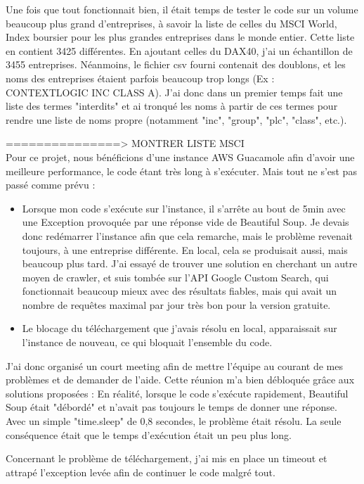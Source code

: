 Une fois que tout fonctionnait bien, il était temps de tester le code sur un volume beaucoup plus grand d'entreprises, à savoir la liste de celles du MSCI World, Index boursier pour les plus grandes entreprises dans le monde entier.
Cette liste en contient 3425 différentes. En ajoutant celles du DAX40, j'ai un échantillon de 3455 entreprises. 
Néanmoins, le fichier csv fourni contenait des doublons, et les noms des entreprises étaient parfois beaucoup trop longs (Ex : CONTEXTLOGIC INC CLASS A).
J'ai donc dans un premier temps fait une liste des termes "interdits" et ai tronqué les noms à partir de ces termes pour rendre une liste de noms propre (notamment "inc", "group", "plc", "class", etc.).

===============> MONTRER LISTE MSCI
\\

Pour ce projet, nous bénéficions d'une instance AWS Guacamole afin d'avoir une meilleure performance, le code étant très long à s'exécuter.
Mais tout ne s'est pas passé comme prévu : 
\begin{itemize}
    \item Lorsque mon code s'exécute sur l'instance, il s'arrête au bout de 5min avec une Exception provoquée par une réponse vide de Beautiful Soup.
    Je devais donc redémarrer l'instance afin que cela remarche, mais le problème revenait toujours, à une entreprise différente. En local, cela se produisait aussi, mais beaucoup plus tard.
    J'ai essayé de trouver une solution en cherchant un autre moyen de crawler, et suis tombée sur l'API Google Custom Search, qui fonctionnait beaucoup mieux avec des résultats fiables, mais qui avait un nombre de requêtes maximal par jour très bon pour la version gratuite.
    \item Le blocage du téléchargement que j'avais résolu en local, apparaissait sur l'instance de nouveau, ce qui bloquait l'ensemble du code.
\end{itemize}

J'ai donc organisé un court meeting afin de mettre l'équipe au courant de mes problèmes et de demander de l'aide.
Cette réunion m'a bien débloquée grâce aux solutions proposées :
En réalité, lorsque le code s'exécute rapidement, Beautiful Soup était "débordé" et n'avait pas toujours le temps de donner une réponse.
Avec un simple "time.sleep" de 0,8 secondes, le problème était résolu. La seule conséquence était que le temps d'exécution était un peu plus long.

Concernant le problème de téléchargement, j'ai mis en place un timeout et attrapé l'exception levée afin de continuer le code malgré tout.
\\

